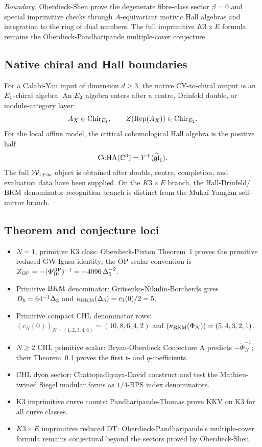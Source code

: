 \emph{Boundary.} Oberdieck-Shen prove the degenerate fibre-class
sector \(\beta=0\) and special imprimitive checks through
\(A\)-equivariant motivic Hall algebras and integration to the ring of
dual numbers. The full imprimitive \(K3\times E\) formula remains the
Oberdieck-Pandharipande multiple-cover conjecture.

\subsection*{Native chiral and Hall boundaries}

For a Calabi-Yau input of dimension \(d\ge3\), the native
CY-to-chiral output is an \(E_1\)-chiral algebra. An \(E_2\) algebra
enters after a centre, Drinfeld double, or module-category layer:
\[
  A_X\in\mathrm{Chir}_{E_1},
  \qquad
  Z(\mathrm{Rep}(A_X))\in\mathrm{Chir}_{E_2}.
\]
For the local affine model, the critical cohomological Hall algebra is
the positive half
\[
  \mathrm{CoHA}(\mathbb{C}^3)=Y^+(\widehat{\mathfrak{gl}}_1).
\]
The full \(\mathcal W_{1+\infty}\) object is obtained after double, centre, completion,
and evaluation data have been supplied. On the \(K3\times E\) branch,
the Hall-Drinfeld/\(\mathrm{BKM}\) denominator-recognition branch is distinct
from the Mukai Yangian self-mirror branch.

\subsection*{Theorem and conjecture loci}

\begin{itemize}
\item \(N=1\), primitive K3 class: Oberdieck-Pixton Theorem~1 proves
  the primitive reduced GW Igusa identity; the OP scalar convention is
  \(Z_{\mathrm{OP}}=-(\Phi_{10}^{\mathrm{OP}})^{-1}=-4096\,\Delta_5^{-2}\).
\item Primitive \(\mathrm{BKM}\) denominator: Gritsenko-Nikulin-Borcherds gives
  \(D_5=64^{-1}\Delta_5\) and
  \(\kappa_{\mathrm{BKM}}(\Delta_5)=c_1(0)/2=5\).
\item Primitive compact CHL denominator rows:
  \((c_N(0))_{N=(1,2,3,4,6)}=(10,8,6,4,2)\) and
  \((\kappa_{\mathrm{BKM}}(\Phi_N))=(5,4,3,2,1)\).
\item \(N\ge2\) CHL primitive scalar: Bryan-Oberdieck Conjecture A
  predicts \(-\widetilde\Phi_N^{-1}\); their Theorem~0.1 proves the
  first \(t\)- and \(q\)-coefficients.
\item CHL dyon sector: Chattopadhyaya-David construct and test the
  Mathieu-twined Siegel modular forms as \(1/4\)-BPS index
  denominators.
\item K3 imprimitive curve counts: Pandharipande-Thomas prove KKV on
  K3 for all curve classes.
\item \(K3\times E\) imprimitive reduced DT: Oberdieck-Pandharipande's
  multiple-cover formula remains conjectural beyond the sectors proved
  by Oberdieck-Shen.
\end{itemize}
